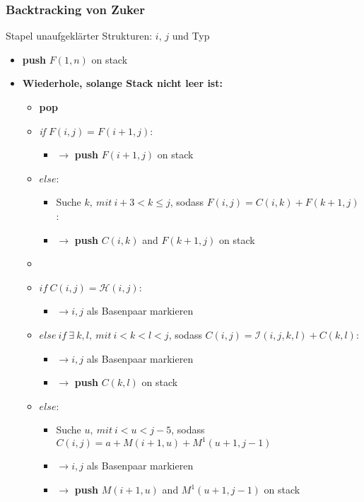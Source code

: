 \subsubsection{Backtracking von Zuker}
Stapel unaufgekl\"arter Strukturen: $i$, $j$ und Typ
\begin{itemize}
	\item[] \textbf{push} $F(1,n)$ on stack
	\item[] \textbf{Wiederhole, solange Stack nicht leer ist:}
	\begin{itemize}
		\item[] \textbf{pop}
		\item[] \textit{if} $F(i,j)=F(i+1, j)$:
			\begin{itemize}
				\item[] $\rightarrow$ \textbf{push} $F(i+1, j)$ on stack
			\end{itemize}
		\item[] $else$:
			\begin{itemize}
				\item[] Suche $k,~mit~i+3 < k \le j$, sodass $F(i,j) = C(i,k) + F(k+1,j)$:
				\item[] $\rightarrow$ \textbf{push} $C(i, k)$ and $F(k+1, j)$ on stack
			\end{itemize}
		\item[]
		\item[] $if~C(i,j) = \mathcal{H}(i,j)$:
			\begin{itemize}
				\item[] $\rightarrow i,j$ als Basenpaar markieren
			\end{itemize}
		\item[] $else~if~\exists~k,l,~mit~i < k < l < j$, sodass $C(i,j) = \mathcal{I}(i,j,k, l) + C(k,l)$:
			\begin{itemize}
				\item[] $\rightarrow i,j$ als Basenpaar markieren
				\item[] $\rightarrow$ \textbf{push} $C(k,l)$ on stack
			\end{itemize}
		\item[] $else$:
			\begin{itemize}
				\item[] Suche $u,~mit~i < u < j-5$, sodass $C(i,j) = a + M(i+1, u) + M^1(u+1, j-1)$
				\item[] $\rightarrow i,j$ als Basenpaar markieren
				\item[] $\rightarrow$ \textbf{push} $M(i+1, u)$ and $M^1(u+1,j-1)$ on stack
			\end{itemize}

\end{itemize}
\end{itemize}
